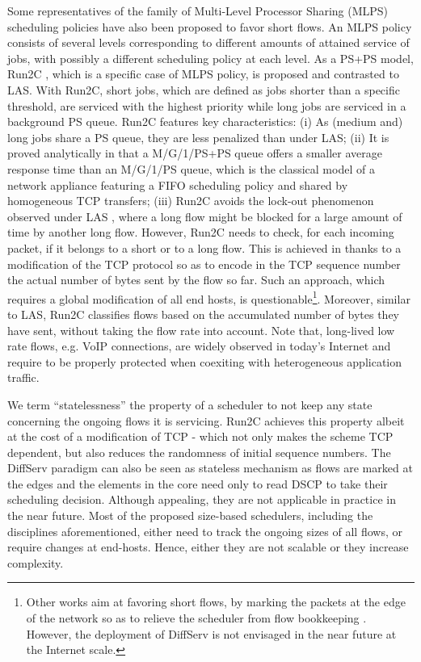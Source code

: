 \documentclass[preprint,12pt]{elsarticle}
\begin{document}
Some representatives of the family of Multi-Level Processor Sharing (MLPS) scheduling policies \cite{kleinrock_76_queueing} have also been proposed to favor short flows. An MLPS policy consists of several levels corresponding to different amounts of attained service of jobs, with possibly a different scheduling policy at each level. As a PS+PS model, Run2C \cite{Avrachenkov04Run2c}, which is a specific case of MLPS policy, is proposed and contrasted to LAS. With Run2C, short jobs, which are defined as jobs shorter than a specific threshold, are serviced with the highest priority while long jobs are serviced in a background PS queue. Run2C features key characteristics: (i) As (medium and) long jobs share a PS queue, they are less penalized than under LAS; (ii) It is proved analytically in \cite{Avrachenkov04Run2c} that a M/G/1/PS+PS queue offers a smaller average response time than an M/G/1/PS queue, which is the classical model of a network appliance featuring a FIFO scheduling policy and shared by homogeneous TCP transfers; (iii) Run2C avoids the lock-out phenomenon observed under LAS \cite{Martin10Lars}, where a long flow might be blocked for a large amount of time by another long flow. However, Run2C needs to check, for each incoming packet, if it belongs to a short or to a long flow. This is achieved in \cite{Avrachenkov04Run2c} thanks to a modification of the TCP protocol so as to encode in the TCP sequence number the actual number of bytes sent by the flow so far. Such an approach, which requires a global modification of all end hosts, is questionable\footnote{Other works aim at favoring short flows, by marking the packets at the edge of the network so as to relieve the scheduler from flow bookkeeping \cite{Noureddine02improvingthe}. However, the deployment of DiffServ is not envisaged in the near future at the Internet scale.}. Moreover, similar to LAS, Run2C classifies flows based on the accumulated number of bytes they have sent, without taking the flow rate into account. Note that, long-lived low rate flows, e.g. VoIP connections, are widely observed in today's Internet and require to be properly protected when coexiting with heterogeneous application traffic. 

We term ``statelessness'' the property of a scheduler to not keep any state concerning the ongoing flows it is servicing. Run2C achieves this property albeit at the cost of a modification of TCP -  which not only makes the scheme TCP dependent, but also reduces the randomness of initial sequence numbers. The DiffServ\cite{Noureddine02improvingthe} paradigm can also be seen as stateless mechanism as flows are marked at the edges and the elements in the core need only to read DSCP to take their scheduling decision. Although appealing, they are not applicable in practice in the near future. Most of the proposed size-based schedulers, including the disciplines aforementioned, either need to track the ongoing sizes of all flows, or require changes at end-hosts. Hence, either they are not scalable or they increase complexity. 
\end{document}
